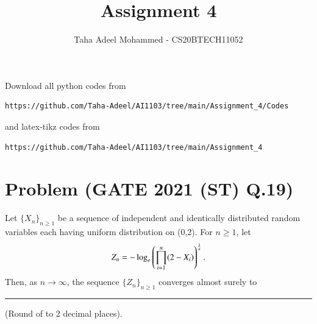 \documentclass[journal,12pt,twocolumn]{IEEEtran}
\begin{document}
     \def\rightbox#1{\makebox[0in][r]{#1}}
     \def\centbox#1{\makebox[0in]{#1}}
     \def\topbox#1{\raisebox{-\baselineskip}[0in][0in]{#1}}
     \def\midbox#1{\raisebox{-0.5\baselineskip}[0in][0in]{#1}}
\vspace{3cm}
\title{Assignment 4}
\author{Taha Adeel Mohammed - CS20BTECH11052}
\maketitle
\newpage
\bigskip
\renewcommand{\thefigure}{\theenumi}
\renewcommand{\thetable}{\theenumi}
Download all python codes from 
\begin{lstlisting}
https://github.com/Taha-Adeel/AI1103/tree/main/Assignment_4/Codes
\end{lstlisting}
%
and latex-tikz codes from 
%
\begin{lstlisting}
https://github.com/Taha-Adeel/AI1103/tree/main/Assignment_4
\end{lstlisting}
\section{Problem (GATE 2021 (ST) Q.19)}
Let $\{ X_n \}_{n \geq 1}$ be a sequence of independent and identically distributed random variables each having uniform distribution on (0,2). For $n \geq 1$, let 
$$Z_n = -\log_e \left( \prod\limits_{i=1}^n (2-X_i) \right)^\frac{1}{n}.
$$
Then, as $n \to \infty$, the sequence $\{ Z_n \}_{n \geq 1}$ converges almost surely to \rule{1cm}{0.15mm} (Round of to 2 decimal places).
\end{document}

